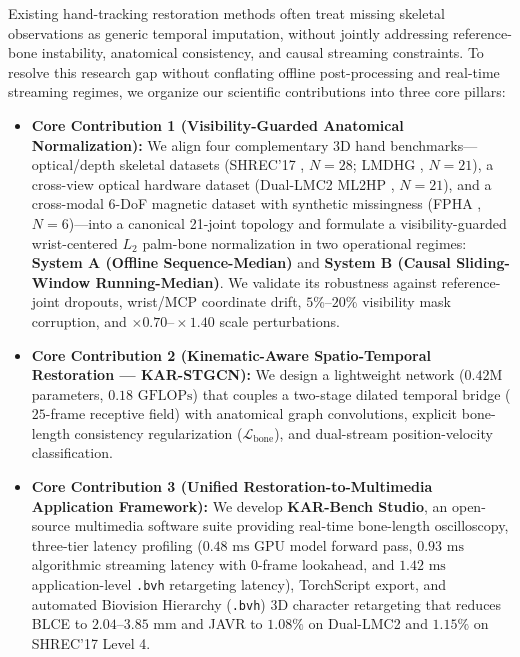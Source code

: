 \documentclass[10pt,twocolumn]{article}
\begin{document}
Existing hand-tracking restoration methods often treat missing skeletal observations as generic temporal imputation, without jointly addressing reference-bone instability, anatomical consistency, and causal streaming constraints. To resolve this research gap without conflating offline post-processing and real-time streaming regimes, we organize our scientific contributions into three core pillars:
\begin{itemize}
    \item \textbf{Core Contribution 1 (Visibility-Guarded Anatomical Normalization):} We align four complementary 3D hand benchmarks---optical/depth skeletal datasets (SHREC'17 \cite{desmedt2017shrec}, $N=28$; LMDHG \cite{boulahia2017dynamic}, $N=21$), a cross-view optical hardware dataset (Dual-LMC2 ML2HP \cite{gilmartin2024dual}, $N=21$), and a cross-modal 6-DoF magnetic dataset with synthetic missingness (FPHA \cite{garcia2018first}, $N=6$)---into a canonical 21-joint topology and formulate a visibility-guarded wrist-centered $L_2$ palm-bone normalization in two operational regimes: \textbf{System A (Offline Sequence-Median)} and \textbf{System B (Causal Sliding-Window Running-Median)}. We validate its robustness against reference-joint dropouts, wrist/MCP coordinate drift, $5\%\text{--}20\%$ visibility mask corruption, and $\times 0.70\text{--}\times 1.40$ scale perturbations.
    \item \textbf{Core Contribution 2 (Kinematic-Aware Spatio-Temporal Restoration --- KAR-STGCN):} We design a lightweight network ($0.42\text{M}$ parameters, $0.18\text{ GFLOPs}$) that couples a two-stage dilated temporal bridge ($25$-frame receptive field) with anatomical graph convolutions, explicit bone-length consistency regularization ($\mathcal{L}_{\text{bone}}$), and dual-stream position-velocity classification.
    \item \textbf{Core Contribution 3 (Unified Restoration-to-Multimedia Application Framework):} We develop \textbf{KAR-Bench Studio}, an open-source multimedia software suite providing real-time bone-length oscilloscopy, three-tier latency profiling ($0.48\text{ ms}$ GPU model forward pass, $0.93\text{ ms}$ algorithmic streaming latency with $0$-frame lookahead, and $1.42\text{ ms}$ application-level \texttt{.bvh} retargeting latency), TorchScript export, and automated Biovision Hierarchy (\texttt{.bvh}) 3D character retargeting that reduces BLCE to $2.04\text{--}3.85\text{ mm}$ and JAVR to $1.08\%$ on Dual-LMC2 and $1.15\%$ on SHREC'17 Level 4.
\end{itemize}
\end{document}
